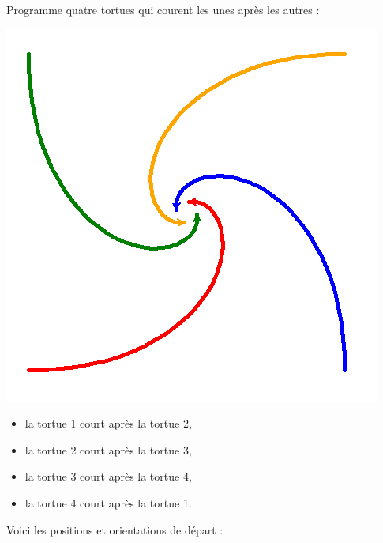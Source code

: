\documentclass[11pt,class=report,crop=false]{standalone}
\begin{document}

\begin{activite}



Programme quatre tortues qui courent les unes après les autres :

\begin{center}
\includegraphics[scale=0.5]{ecran-tortue-6a}
\end{center}


\begin{itemize}
  \item la tortue 1 court après la tortue 2,
  \item la tortue 2 court après la tortue 3,
  \item la tortue 3 court après la tortue 4,
  \item la tortue 4 court après la tortue 1.
\end{itemize}

\bigskip

Voici les positions et orientations de départ :



\end{activite}
\end{document}
